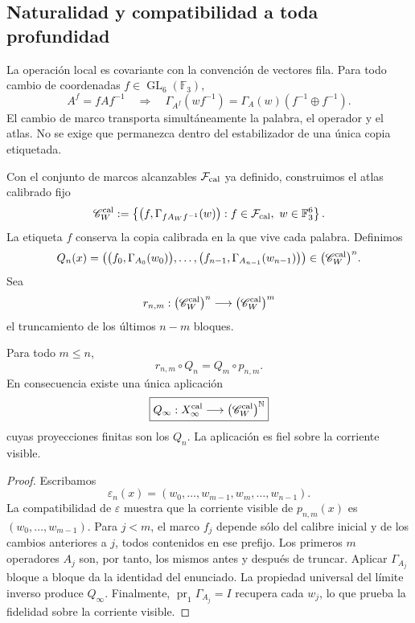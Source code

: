 \subsection{Naturalidad y compatibilidad a toda profundidad}

La operación local es covariante con la convención de vectores fila. Para
todo cambio de coordenadas \(f\in\operatorname{GL}_6(\mathbb F_3)\),
\[
A^f=fAf^{-1}
\quad\Longrightarrow\quad
\Gamma_{A^f}(wf^{-1})
=\Gamma_A(w)(f^{-1}\oplus f^{-1}).
\]
El cambio de marco transporta simultáneamente la palabra, el operador y el
atlas. No se exige que permanezca dentro del estabilizador de una única copia
etiquetada.

Con el conjunto de marcos alcanzables \(\mathcal F_{\rm cal}\) ya definido,
construimos el atlas calibrado fijo
\[
 \mathscr C_W^{\rm cal}
 :=
 \left\{
 \bigl(f,\Gamma_{fA_Wf^{-1}}(w)\bigr):
 f\in\mathcal F_{\rm cal},\ w\in\mathbb F_3^6
 \right\}.
\]
La etiqueta \(f\) conserva la copia calibrada en la que vive cada palabra.
Definimos
\[
Q_n(x)=
\bigl(
\bigl(f_0,\Gamma_{A_0}(w_0)\bigr),\ldots,
\bigl(f_{n-1},\Gamma_{A_{n-1}}(w_{n-1})\bigr)
\bigr)\in\bigl(\mathscr C_W^{\rm cal}\bigr)^n.
\]
Sea
\[
 r_{n,m}:
 \bigl(\mathscr C_W^{\rm cal}\bigr)^n
 \longrightarrow
 \bigl(\mathscr C_W^{\rm cal}\bigr)^m
\]
el truncamiento de los últimos \(n-m\) bloques.

\begin{theorem}
\label{p12-83-c17-s2:thm:lector-excepcional-global-rev6}
\label{thm:lector-excepcional-global-rev6}
Para todo \(m\leq n\),
\[
\boxed{r_{n,m}\circ Q_n=Q_m\circ p_{n,m}.}
\]
En consecuencia existe una única aplicación
\[
\boxed{
Q_\infty:X_\infty^{\rm cal}
\longrightarrow
\bigl(\mathscr C_W^{\rm cal}\bigr)^{\mathbb N}}
\]
cuyas proyecciones finitas son los \(Q_n\). La aplicación es fiel sobre la
corriente visible.
\end{theorem}

\begin{proof}
Escribamos
\[
\varepsilon_n(x)
=(w_0,\ldots,w_{m-1},w_m,\ldots,w_{n-1}).
\]
La compatibilidad de \(\varepsilon\) muestra que la corriente visible de
\(p_{n,m}(x)\) es \((w_0,\ldots,w_{m-1})\). Para \(j<m\), el marco
\(f_j\) depende sólo del calibre inicial y de los cambios anteriores a
\(j\), todos contenidos en ese prefijo. Los primeros \(m\) operadores
\(A_j\) son, por tanto, los mismos antes y después de truncar. Aplicar
\(\Gamma_{A_j}\) bloque a bloque da la identidad del enunciado. La propiedad
universal del límite inverso produce \(Q_\infty\). Finalmente,
\(\operatorname{pr}_1\Gamma_{A_j}=I\) recupera cada \(w_j\), lo que prueba
la fidelidad sobre la corriente visible.
\end{proof}

